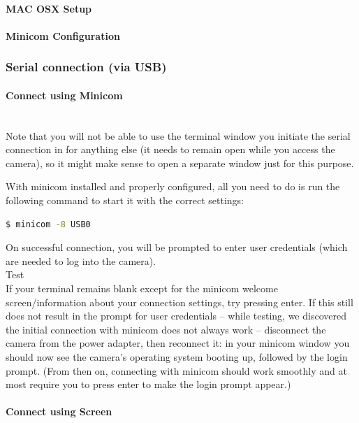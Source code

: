 \paragraph{MAC OSX Setup}
\paragraph{Minicom Configuration}
\subsubsection{Serial connection (via USB)}
\paragraph{Connect using Minicom}\mbox{}\\
Note that you will not be able to use the terminal window you initiate the serial connection in for anything else (it needs to remain open while you access the camera), so it might make sense to open a separate window just for this purpose.

With minicom installed and properly configured, all you need to do is run the following command to start it with the correct settings:

\begin{lstlisting}[language=bash,morekeywords=$,keywordstyle=\bfseries,frame=none,xleftmargin=.25in,belowskip=2em, aboveskip=2em]
$ minicom -8 USB0
\end{lstlisting}

On successful connection, you will be prompted to enter user credentials (which are needed to log into the camera).\\

Test\\

If your terminal remains blank except for the minicom welcome screen/information about your connection settings, try pressing enter. If this still does not result in the prompt for user credentials – while testing, we discovered the initial connection with minicom does not always work – disconnect the camera from the power adapter, then reconnect it: in your minicom window you should now see the camera's operating system booting up, followed by the login prompt. (From then on, connecting with minicom should work smoothly and at most require you to press enter to make the login prompt appear.)

\paragraph{Connect using Screen}
